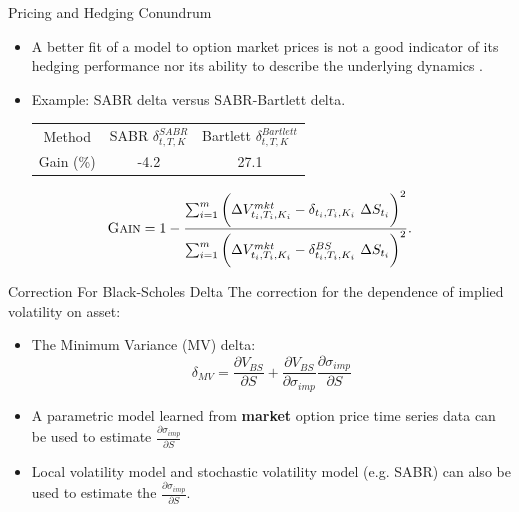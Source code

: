 \documentclass[10pt,table,mathserif]{beamer}
\begin{document}
\begin{frame}{Pricing and Hedging Conundrum}
\begin{itemize}
  \item A better fit of a model to option market prices is not a good indicator of its hedging performance nor its ability to describe the underlying dynamics \footnotemark. 
  \item Example: SABR delta versus SABR-Bartlett delta.
    \begin{table}[htp!]
        \centering
        \begin{tabular}{|c|c|c|}
            \hline
            Method& SABR $\delta^{SABR}_{t,T,K}$ & Bartlett $\delta^{Bartlett}_{t,T,K}$\\
            Gain (\%) &-4.2 & 27.1 \\
            \hline
        \end{tabular}
        \label{table:Bartlett}
    \end{table}
\end{itemize}
    \[
    \textsc{Gain}=1-\frac{\sum_{i=1}^m \bigg(\Delta V^{mkt}_{t_i,T_i,K_i}-\delta_{t_i,T_i,K_i} ~ \Delta S_{t_i} \bigg)^2}{\sum_{i=1}^m \bigg(\Delta V^{mkt}_{t_i,T_i,K_i}-\delta^{BS}_{t_i,T_i,K_i} ~ \Delta S_{t_i} \bigg)^2}.
    \label{eq:Gain}
    \]

\end{frame}


\begin{frame}{Correction For Black-Scholes Delta}
The correction for  the dependence of implied volatility on asset:
\begin{itemize}
	\item The Minimum Variance (MV) delta:
	\[
	\delta_{MV}=\frac{\partial V_{BS}}{\partial S}+\frac{\partial V_{BS}}{\partial \sigma_{imp}}\frac{\partial \sigma_{imp}}{ \partial S}
	\]
	\item  A parametric model \footnotemark learned from \textbf{market} option price time series data can be used to estimate $\frac{\partial \sigma_{imp}}{ \partial S}$
	\item Local volatility model and stochastic volatility model (e.g. SABR)  can also be used to estimate the $\frac{\partial \sigma_{imp}}{ \partial S}$.
\end{itemize}
\end{frame}
\end{document}
